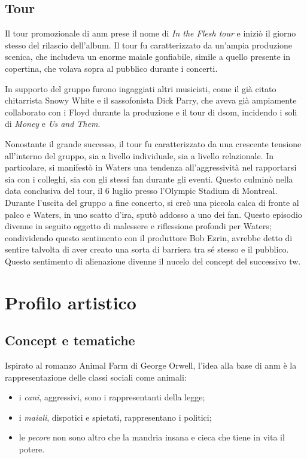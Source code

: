 \documentclass[class=book, crop=false, oneside, 12pt]{standalone}
\begin{document}
    \subsection{Tour}
    Il tour promozionale di \acrshort{anm} prese il nome di \emph{In the Flesh tour} e iniziò il giorno stesso del rilascio dell'album. Il tour fu caratterizzato da un'ampia produzione scenica, che includeva un enorme maiale gonfiabile, simile a quello presente in copertina, che volava sopra al pubblico durante i concerti. 

    In supporto del gruppo furono ingaggiati altri musicisti, come il già citato chitarrista Snowy White e il sassofonista Dick Parry, che aveva già ampiamente collaborato con i Floyd durante la produzione e il tour di \acrlong{dsom}, incidendo i soli di \emph{Money} e \emph{Us and Them}.

    Nonostante il grande successo, il tour fu caratterizzato da una crescente tensione all'interno del gruppo, sia a livello individuale, sia a livello relazionale. In particolare, si manifestò in Waters una tendenza all'aggressività nel rapportarsi sia con i colleghi, sia con gli stessi fan durante gli eventi. Questo culminò nella data conclusiva del tour, il 6 luglio presso l'Olympic Stadium di Montreal. Durante l'uscita del gruppo a fine concerto, si creò una piccola calca di fronte al palco  e Waters, in uno scatto d'ira, sputò addosso a uno dei fan. Questo episodio divenne in seguito oggetto di malessere e riflessione profondi per Waters; condividendo questo sentimento con il produttore Bob Ezrin, avrebbe detto di sentire talvolta di aver creato una sorta di barriera tra sé stesso e il pubblico. Questo sentimento di alienazione divenne il nucelo del concept del successivo \acrlong{tw}.
    
    \section{Profilo artistico}

    \subsection{Concept e tematiche}
    \label{subsec:animals-concept}
    Ispirato al romanzo Animal Farm di George Orwell, l'idea alla base di \acrshort{anm} è la rappresentazione delle classi sociali come  animali: 
    \begin{itemize}
        \item i \emph{cani}, aggressivi, sono i rappresentanti della legge;
        \item i \emph{maiali}, dispotici e spietati, rappresentano i politici;
        \item le \emph{pecore} non sono altro che la mandria insana e cieca che tiene in vita il potere.
    \end{itemize}
    
\end{document}
